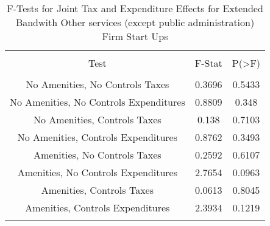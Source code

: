 
\begin{table}[!htbp] \centering 
  \caption{F-Tests for Joint Tax and Expenditure Effects for Extended Bandwith Other services (except public administration) Firm Start Ups} 
  \label{81Ftests} 
\begin{tabular}{@{\extracolsep{5pt}} ccc} 
\\[-1.8ex]\hline 
\hline \\[-1.8ex] 
Test & F-Stat & P(\textgreater F) \\ 
\hline \\[-1.8ex] 
No Amenities, No Controls Taxes & 0.3696 & 0.5433 \\ 
No Amenities, No Controls Expenditures & 0.8809 & 0.348 \\ 
No Amenities, Controls Taxes & 0.138 & 0.7103 \\ 
No Amenities, Controls Expenditures & 0.8762 & 0.3493 \\ 
Amenities, No Controls Taxes & 0.2592 & 0.6107 \\ 
Amenities, No Controls Expenditures & 2.7654 & 0.0963 \\ 
Amenities, Controls Taxes & 0.0613 & 0.8045 \\ 
Amenities, Controls Expenditures & 2.3934 & 0.1219 \\ 
\hline \\[-1.8ex] 
\end{tabular} 
\end{table} 
